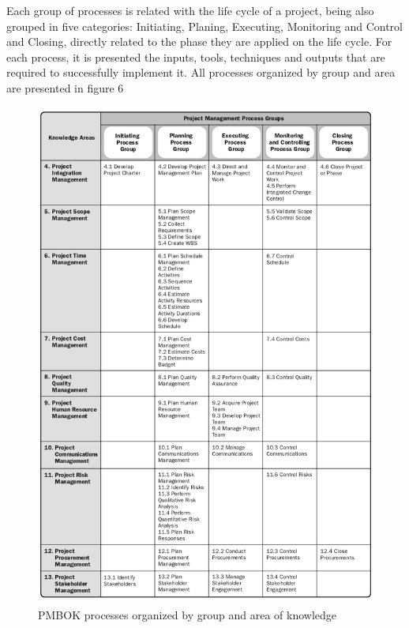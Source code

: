 Each group of processes is related with the life cycle of a project, being also grouped in five categories: Initiating, Planing, Executing, Monitoring and Control and Closing, directly related to the phase they are applied on the life cycle. For each process, it is presented the inputs, tools, techniques and outputs that are required to successfully implement it. All processes organized by group and area are presented in figure 6\par

\begin{figure}
\centering
\includegraphics[width=\textwidth]{img/PMBOKprocesses.png}
\caption{PMBOK processes organized by group and area of knowledge}
\end{figure}


